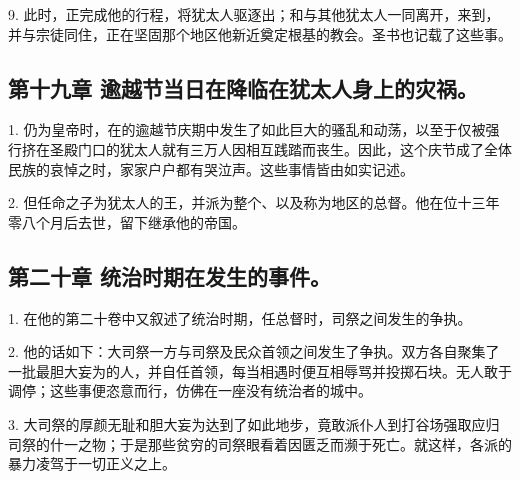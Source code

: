 9. 此时，正完成他的行程，将犹太人驱逐出；和与其他犹太人一同离开，来到，并与宗徒同住，正在坚固那个地区他新近奠定根基的教会。圣书也记载了这些事。\par


\subsection{第十九章 逾越节当日在降临在犹太人身上的灾祸。}

1. 仍为皇帝时，在的逾越节庆期中发生了如此巨大的骚乱和动荡，以至于仅被强行挤在圣殿门口的犹太人就有三万人因相互践踏而丧生。因此，这个庆节成了全体民族的哀悼之时，家家户户都有哭泣声。这些事情皆由如实记述。\par

2. 但任命之子为犹太人的王，并派为整个、以及称为地区的总督。他在位十三年零八个月后去世，留下继承他的帝国。\par


\subsection{第二十章 统治时期在发生的事件。}

1. 在他的第二十卷中又叙述了统治时期，任总督时，司祭之间发生的争执。\par

2. 他的话如下：大司祭一方与司祭及民众首领之间发生了争执。双方各自聚集了一批最胆大妄为的人，并自任首领，每当相遇时便互相辱骂并投掷石块。无人敢于调停；这些事便恣意而行，仿佛在一座没有统治者的城中。\par

3. 大司祭的厚颜无耻和胆大妄为达到了如此地步，竟敢派仆人到打谷场强取应归司祭的什一之物；于是那些贫穷的司祭眼看着因匮乏而濒于死亡。就这样，各派的暴力凌驾于一切正义之上。\par

